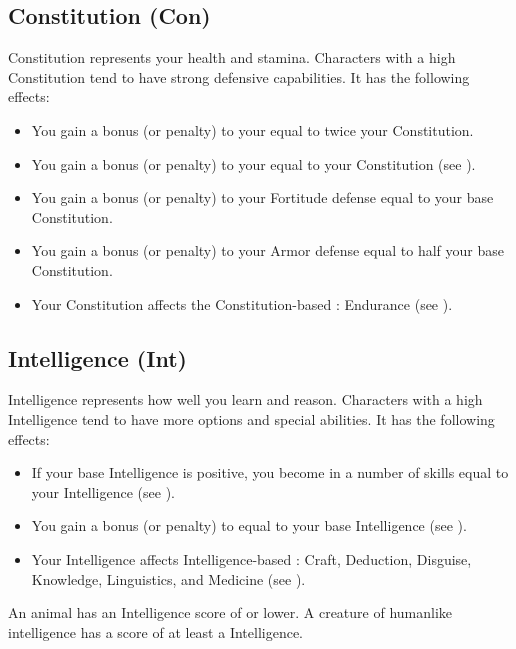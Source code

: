     \subsection{Constitution (Con)}\label{Constitution}
        {
            Constitution represents your health and stamina.
            Characters with a high Constitution tend to have strong defensive capabilities.
            It has the following effects:
            \begin{itemize}
                \item You gain a bonus (or penalty) to your  equal to twice your Constitution.
                \item You gain a bonus (or penalty) to your  equal to your Constitution (see ).
                \item You gain a bonus (or penalty) to your Fortitude defense equal to your base Constitution.
                \item You gain a bonus (or penalty) to your Armor defense equal to half your base Constitution.
                \item Your Constitution affects the Constitution-based : Endurance (see ).
            \end{itemize}
        }

    \subsection{Intelligence (Int)}\label{Intelligence}
        {
            Intelligence represents how well you learn and reason.
            Characters with a high Intelligence tend to have more options and special abilities.
            It has the following effects:

            \begin{itemize}
                \item If your base Intelligence is positive, you become  in a number of skills equal to your Intelligence (see ).
                \item You gain a bonus (or penalty) to  equal to your base Intelligence (see ).
                \item Your Intelligence affects Intelligence-based : Craft, Deduction, Disguise, Knowledge, Linguistics, and Medicine (see ).
            \end{itemize}

            \par An animal has an Intelligence score of  or lower.
            A creature of humanlike intelligence has a score of at least a  Intelligence.
        }

